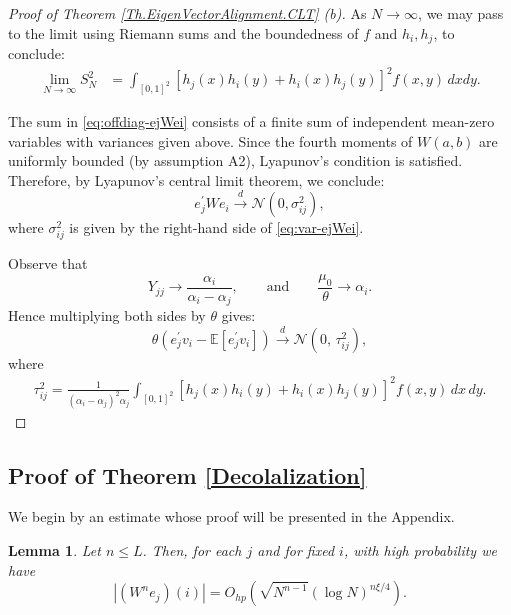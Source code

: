 \documentclass[11pt, reqno]{amsart}
\numberwithin{equation}{section}
\newtheorem{lemma}{Lemma}[section]
\begin{document}
\begin{proof}[Proof of Theorem \ref{Th.EigenVectorAlignment.CLT} (b)]
As $N \to \infty$, we may pass to the limit using Riemann sums and the boundedness of $f$ and $h_i, h_j$, to conclude:
\begin{align}
\lim_{N \to \infty} S_N^2 &= \int_{[0,1]^2} \left[h_j(x) h_i(y) + h_i(x) h_j(y)\right]^2 f(x,y)\, dxdy. \label{eq:var-ejWei}
\end{align}

The sum in \eqref{eq:offdiag-ejWei} consists of a finite sum of independent mean-zero variables with variances given above. Since the fourth moments of $W(a,b)$ are uniformly bounded (by assumption A2), Lyapunov’s condition is satisfied. Therefore, by Lyapunov’s central limit theorem, we conclude:
\[
e_j^\prime W e_i \xrightarrow{d} \mathcal{N}(0, \sigma_{ij}^2),
\]
where $\sigma_{ij}^2$ is given by the right-hand side of \eqref{eq:var-ejWei}.

Observe that
\[
Y_{jj}  \to \frac{\alpha_i}{\alpha_i - \alpha_j}, \qquad \text{and} \qquad \frac{\mu_0}{\theta} \to \alpha_i.
\]
Hence multiplying both sides by $\theta$ gives:
\[
\theta \left(e_j^\prime v_i - \mathbb{E}[e_j^\prime v_i]\right) \xrightarrow{d} \mathcal{N}\left(0,\, \tau_{ij}^2\right),
\]
where
\begin{align*}
\tau_{ij}^2 = \frac{1}{(\alpha_i-\alpha_j)^2 \alpha_j}\int_{[0,1]^2} \left[h_j(x) h_i(y) + h_i(x) h_j(y)\right]^2 f(x,y)\, dx\, dy.
\end{align*}
\end{proof}

\subsection{Proof of Theorem \ref{Decolalization}}
We begin by an estimate whose proof will be presented in the Appendix.


\begin{lemma}\label{Deloc.est}
Let \( n \le L \). Then, for each \( j \) and for fixed \( i \), with high probability we have
\[
\left| (W^n e_j)(i) \right| = O_{hp}\left( \sqrt{N^{n-1}} (\log N)^{n\xi/4} \right).
\]
\end{lemma}
\end{document}
